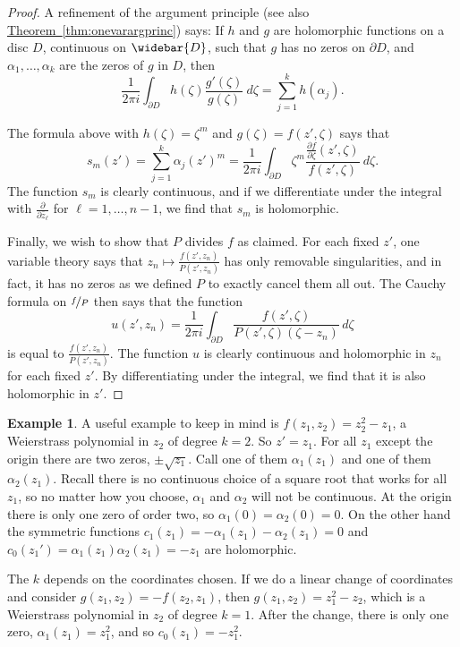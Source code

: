 \documentclass[12pt,openany]{book}
\theoremstyle{plain}
\theoremstyle{remark}
\theoremstyle{definition}
\theoremstyle{exercise}
\theoremstyle{example}
\newtheorem{example}[thm]{Example}
\newcommand{\thmref}[1]{\hyperref[#1]{Theorem~\ref*{#1}}}
\begin{document}
\begin{proof}
A refinement of the argument principle (see also \thmref{thm:onevarargprinc}) says:
If $h$ and $g$ are
holomorphic functions on a disc $D$, continuous on $\widebar{D}$,
such that $g$ has no zeros on $\partial D$, and $\alpha_1,\ldots,\alpha_k$
are the zeros of $g$ in $D$, then
\begin{equation*}
\frac{1}{2 \pi i}
\int_{\partial D} h(\zeta) \frac{g'(\zeta)}{g(\zeta)} ~d\zeta
= \sum_{j=1}^k h(\alpha_j) .
\end{equation*}

The formula above with $h(\zeta) = \zeta^m$ and $g(\zeta)=f(z',\zeta)$ says that
\begin{equation*}
s_m(z') = 
\sum_{j=1}^k \alpha_j{(z')}^m
=
\frac{1}{2\pi i}
\int_{\partial D}
\zeta^m
\frac{\frac{\partial f}{\partial \zeta} (z',\zeta)}{f(z',\zeta)} ~d\zeta .
\end{equation*}
The function $s_m$ is clearly continuous, and if we
differentiate under the integral
with $\frac{\partial}{\partial\bar{z}_\ell}$
for $\ell=1,\ldots,{n-1}$,
we find that $s_m$
is holomorphic.

Finally, we wish to show that $P$ divides $f$ as claimed.
For each fixed $z'$, one variable theory says that
$z_n \mapsto \frac{f(z',z_n)}{P(z',z_n)}$ has only removable singularities,
and in fact, it has no zeros as we defined $P$
to exactly cancel them all out.
The Cauchy
formula on $\nicefrac{f}{P}$ then says that the function
\begin{equation*}
u(z',z_n) =
\frac{1}{2\pi i}
\int_{\partial D} \frac{f(z',\zeta)}{P(z',\zeta)(\zeta-z_n)} \,
d\zeta
\end{equation*}
is equal to $\frac{f(z',z_n)}{P(z',z_n)}$.
The function $u$ is clearly continuous and holomorphic in $z_n$
for each fixed $z'$.  By differentiating under the integral, we
find that it is also holomorphic in $z'$.
\end{proof}

\begin{example} \label{sqrt:example}
A useful example to keep in mind is $f(z_1,z_2) = z_2^2 - z_1$,
a Weierstrass polynomial in $z_2$ of degree $k=2$.  So $z' = z_1$.
For all $z_1$ except the origin there are two zeros, $\pm \sqrt{z_1}$.
Call one of them $\alpha_1(z_1)$ and one of them $\alpha_2(z_1)$.  Recall
there is no continuous choice of a square root that works for all $z_1$,
so no matter how you choose, $\alpha_1$ and $\alpha_2$ will not be continuous.
At the origin there is only one zero of order two,
so $\alpha_1(0) = \alpha_2(0) = 0$.
On the other hand the
symmetric functions $c_1(z_1) = - \alpha_1(z_1) - \alpha_2(z_1) = 0$
and $c_0(z_1') = \alpha_1(z_1)\alpha_2(z_1) = -z_1$ are holomorphic.

The $k$ depends on the coordinates chosen.  If we do a
linear change of coordinates and consider $g(z_1,z_2) = -f(z_2,z_1)$,
then $g(z_1,z_2) = z_1^2 - z_2$,
which is a Weierstrass polynomial in $z_2$ of degree $k=1$.
After the change, there is only one zero,
$\alpha_1(z_1) = z_1^2$, and so $c_0(z_1) =
-z_1^2$.
\end{example}
\end{document}
